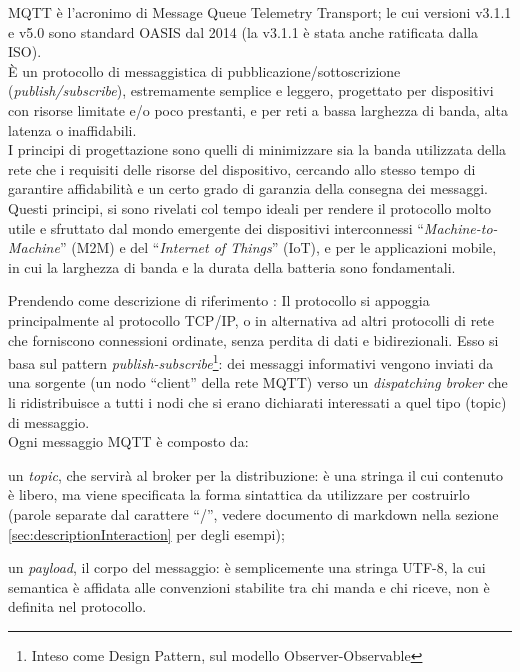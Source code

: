 \documentclass[12pt,a4paper]{report}
\begin{document}
MQTT \cite{mqttOfficial} è l'acronimo di Message Queue Telemetry Transport; le cui versioni v3.1.1 e v5.0 sono standard OASIS dal 2014 (la v3.1.1 è stata anche ratificata dalla ISO). \\
È un protocollo di messaggistica di pubblicazione/sottoscrizione (\textit{publish/subscribe}), estremamente semplice e leggero, progettato per dispositivi con risorse limitate e/o poco prestanti, e per reti a bassa larghezza di banda, alta latenza o inaffidabili. \\
I principi di progettazione sono quelli di minimizzare sia la banda utilizzata della rete che i requisiti delle risorse del dispositivo, cercando allo stesso tempo di garantire affidabilità e un certo grado di garanzia della consegna dei messaggi. Questi principi, si sono rivelati col tempo ideali per rendere il protocollo molto utile e sfruttato dal mondo emergente dei dispositivi interconnessi ``\textit{Machine-to-Machine}'' (M2M) e del ``\textit{Internet of Things}'' (IoT), e per le applicazioni mobile, in cui la larghezza di banda e la durata della batteria sono fondamentali.

Prendendo come descrizione di riferimento \cite{sistemiembedded}: Il protocollo si appoggia principalmente al protocollo TCP/IP, o in alternativa ad altri protocolli di rete che forniscono connessioni ordinate, senza perdita di dati e bidirezionali. Esso si basa sul pattern \textit{publish-subscribe}\footnote{Inteso come Design Pattern, sul modello  Observer-Observable}: dei messaggi informativi vengono inviati da una sorgente (un nodo ``client'' della rete MQTT) verso un \textit{dispatching broker} che li ridistribuisce a tutti i nodi che si erano dichiarati interessati a quel tipo (topic) di messaggio.\\
Ogni messaggio MQTT è composto da:

\begin{compactitem}
	\item un \textit{topic}, che servirà al broker per la distribuzione: è una stringa il cui contenuto è libero, ma viene specificata la forma sintattica da utilizzare per costruirlo (parole separate dal carattere ``/'', vedere documento di markdown nella sezione \ref{sec:descriptionInteraction} per degli esempi);
	\item un \textit{payload}, il corpo del messaggio: è semplicemente una stringa UTF-8, la cui semantica è affidata alle convenzioni stabilite tra chi manda e chi riceve, non è definita nel protocollo.
\end{compactitem}
\end{document}

